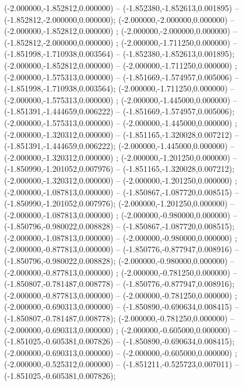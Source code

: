  (-2.000000,-1.852812,0.000000) -- (-1.852380,-1.852613,0.001895) -- (-1.852812,-2.000000,0.000000);
 (-2.000000,-2.000000,0.000000) -- (-2.000000,-1.852812,0.000000) ;
 (-2.000000,-2.000000,0.000000) -- (-1.852812,-2.000000,0.000000) ;
 (-2.000000,-1.711250,0.000000) -- (-1.851998,-1.710938,0.003564) -- (-1.852380,-1.852613,0.001895);
 (-2.000000,-1.852812,0.000000) -- (-2.000000,-1.711250,0.000000) ;
 (-2.000000,-1.575313,0.000000) -- (-1.851669,-1.574957,0.005006) -- (-1.851998,-1.710938,0.003564);
 (-2.000000,-1.711250,0.000000) -- (-2.000000,-1.575313,0.000000) ;
 (-2.000000,-1.445000,0.000000) -- (-1.851391,-1.444659,0.006222) -- (-1.851669,-1.574957,0.005006);
 (-2.000000,-1.575313,0.000000) -- (-2.000000,-1.445000,0.000000) ;
 (-2.000000,-1.320312,0.000000) -- (-1.851165,-1.320028,0.007212) -- (-1.851391,-1.444659,0.006222);
 (-2.000000,-1.445000,0.000000) -- (-2.000000,-1.320312,0.000000) ;
 (-2.000000,-1.201250,0.000000) -- (-1.850990,-1.201052,0.007976) -- (-1.851165,-1.320028,0.007212);
 (-2.000000,-1.320312,0.000000) -- (-2.000000,-1.201250,0.000000) ;
 (-2.000000,-1.087813,0.000000) -- (-1.850867,-1.087720,0.008515) -- (-1.850990,-1.201052,0.007976);
 (-2.000000,-1.201250,0.000000) -- (-2.000000,-1.087813,0.000000) ;
 (-2.000000,-0.980000,0.000000) -- (-1.850796,-0.980022,0.008828) -- (-1.850867,-1.087720,0.008515);
 (-2.000000,-1.087813,0.000000) -- (-2.000000,-0.980000,0.000000) ;
 (-2.000000,-0.877813,0.000000) -- (-1.850776,-0.877947,0.008916) -- (-1.850796,-0.980022,0.008828);
 (-2.000000,-0.980000,0.000000) -- (-2.000000,-0.877813,0.000000) ;
 (-2.000000,-0.781250,0.000000) -- (-1.850807,-0.781487,0.008778) -- (-1.850776,-0.877947,0.008916);
 (-2.000000,-0.877813,0.000000) -- (-2.000000,-0.781250,0.000000) ;
 (-2.000000,-0.690313,0.000000) -- (-1.850890,-0.690634,0.008415) -- (-1.850807,-0.781487,0.008778);
 (-2.000000,-0.781250,0.000000) -- (-2.000000,-0.690313,0.000000) ;
 (-2.000000,-0.605000,0.000000) -- (-1.851025,-0.605381,0.007826) -- (-1.850890,-0.690634,0.008415);
 (-2.000000,-0.690313,0.000000) -- (-2.000000,-0.605000,0.000000) ;
 (-2.000000,-0.525312,0.000000) -- (-1.851211,-0.525723,0.007011) -- (-1.851025,-0.605381,0.007826);
